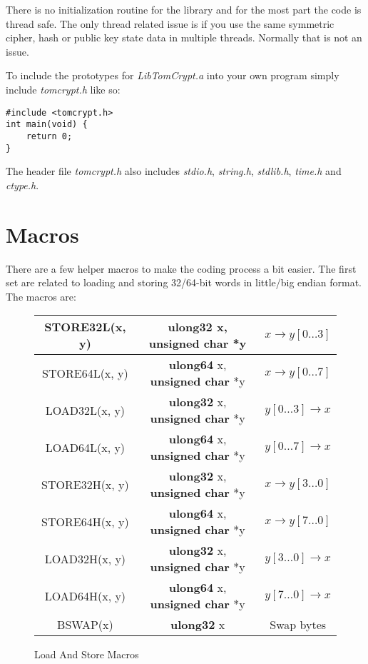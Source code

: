 \documentclass[synpaper]{book}
\newcommand{\mysection}[1]    %
	{                   %
	\section{#1}
   \markboth{\textsf{www.libtom.net}}{\thesection ~ {#1}}
	}
\begin{document}
There is no initialization routine for the library and for the most part the code is thread safe.  The only thread
related issue is if you use the same symmetric cipher, hash or public key state data in multiple threads.  Normally
that is not an issue.

To include the prototypes for \textit{LibTomCrypt.a} into your own program simply include \textit{tomcrypt.h} like so:
\begin{small}
\begin{verbatim}
#include <tomcrypt.h>
int main(void) {
    return 0;
}
\end{verbatim}
\end{small}

The header file \textit{tomcrypt.h} also includes \textit{stdio.h}, \textit{string.h}, \textit{stdlib.h}, \textit{time.h} and \textit{ctype.h}.

\mysection{Macros}

There are a few helper macros to make the coding process a bit easier.  The first set are related to loading and storing
32/64-bit words in little/big endian format.  The macros are:

        
\newpage
\begin{figure}[hpbt]
\begin{small}
\begin{center}
\begin{tabular}{|c|c|c|}
     \hline STORE32L(x, y) & {\bf ulong32} x, {\bf unsigned char} *y & $x \to y[0 \ldots 3]$ \\
     \hline STORE64L(x, y) & {\bf ulong64} x, {\bf unsigned char} *y & $x \to y[0 \ldots 7]$ \\
     \hline LOAD32L(x, y) & {\bf ulong32} x, {\bf unsigned char} *y & $y[0 \ldots 3] \to x$ \\
     \hline LOAD64L(x, y) & {\bf ulong64} x, {\bf unsigned char} *y & $y[0 \ldots 7] \to x$ \\
     \hline STORE32H(x, y) & {\bf ulong32} x, {\bf unsigned char} *y & $x \to y[3 \ldots 0]$ \\
     \hline STORE64H(x, y) & {\bf ulong64} x, {\bf unsigned char} *y & $x \to y[7 \ldots 0]$ \\
     \hline LOAD32H(x, y) & {\bf ulong32} x, {\bf unsigned char} *y & $y[3 \ldots 0] \to x$ \\
     \hline LOAD64H(x, y) & {\bf ulong64} x, {\bf unsigned char} *y & $y[7 \ldots 0] \to x$ \\
     \hline BSWAP(x) & {\bf ulong32} x & Swap bytes \\
     \hline
\end{tabular}
\caption{Load And Store Macros}
\end{center}
\end{small}
\end{figure}
\end{document}
